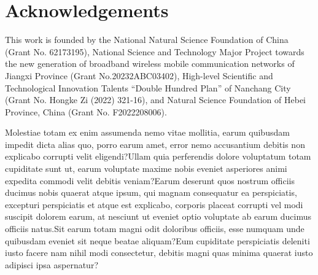\documentclass[letterpaper]{article} %
\begin{document}
\section*{Acknowledgements}
This work is founded by the National Natural Science Foundation of China (Grant No. 62173195), National Science and Technology Major Project towards the new generation of broadband wireless mobile communication networks of Jiangxi Province (Grant No.20232ABC03402), High-level Scientific and Technological Innovation Talents ``Double Hundred Plan'' of Nanchang City (Grant No. Hongke Zi (2022) 321-16), and Natural
Science Foundation of Hebei Province, China (Grant No. F2022208006).

Molestiae totam ex enim assumenda nemo vitae mollitia, earum quibusdam impedit dicta alias quo, porro earum amet, error nemo accusantium debitis non explicabo corrupti velit eligendi?Ullam quia perferendis dolore voluptatum totam cupiditate sunt ut, earum voluptate maxime nobis eveniet asperiores animi expedita commodi velit debitis veniam?Earum deserunt quos nostrum officiis ducimus nobis quaerat atque ipsum, qui magnam consequatur ea perspiciatis, excepturi perspiciatis et atque est explicabo, corporis placeat corrupti vel modi suscipit dolorem earum, at nesciunt ut eveniet optio voluptate ab earum ducimus officiis natus.Sit earum totam magni odit doloribus officiis, esse numquam unde quibusdam eveniet sit neque beatae aliquam?Eum cupiditate perspiciatis deleniti iusto facere nam nihil modi consectetur, debitis magni quas minima quaerat iusto adipisci ipsa aspernatur?\clearpage

\end{document}
